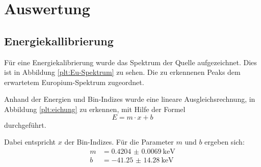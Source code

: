 \newpage
\section{Auswertung}
\label{sec:Auswertung}

\subsection{Energiekallibrierung}
\label{sec:Energiekallibrierung}
Für eine Energiekalibrierung wurde das Spektrum der  Quelle
aufgezeichnet. Dies ist in Abbildung \ref{plt:Eu-Spektrum} zu sehen. Die zu
erkennenen Peaks dem erwartetem Europium-Spektrum zugeordnet.


Anhand der Energien und Bin-Indizes wurde eine lineare Ausgleichsrechnung, in
Abbildung \ref{plt:eichung} zu erkennen, mit Hilfe der Formel
\begin{equation}
  E = m \cdot x + b
\end{equation}
durchgeführt.


Dabei entspricht $x$ der Bin-Indizes. Für die Parameter $m$ und
$b$ ergeben sich:
\begin{align}
  m &= \SI{0.4204(69)}{\kilo\electronvolt} \\
  b &= \SI{-41.25(1428)}{\kilo\electronvolt}
\end{align}



